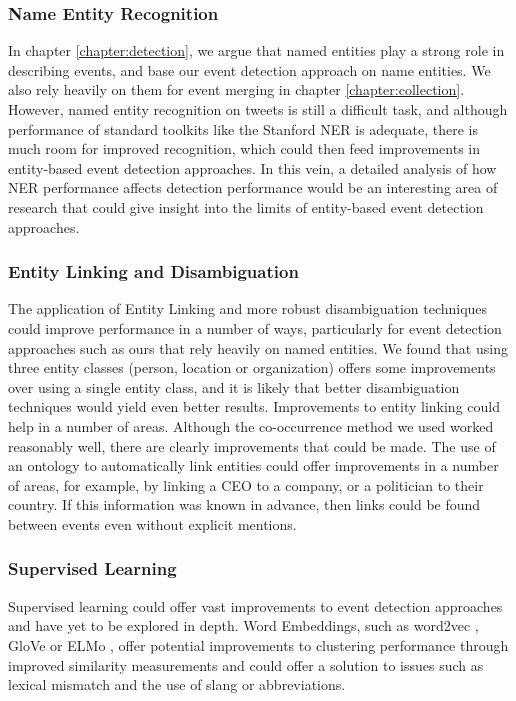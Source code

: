 \subsubsection{Name Entity Recognition}
In chapter \ref{chapter:detection}, we argue that named entities play a strong role in describing events, and base our event detection approach on name entities.
We also rely heavily on them for event merging in chapter \ref{chapter:collection}.
However, named entity recognition on tweets is still a difficult task, and although performance of standard toolkits like the Stanford NER is adequate, there is much room for improved recognition, which could then feed improvements
in entity-based event detection approaches.
In this vein, a detailed analysis of how NER performance affects detection performance would be an interesting area of research that could give insight into the limits of entity-based event detection approaches.

\subsubsection{Entity Linking and Disambiguation}
The application of Entity Linking and more robust disambiguation techniques could improve performance in a number of ways, particularly for event detection approaches such as ours that rely heavily on named entities.
We found that using three entity classes (person, location or organization) offers some improvements over using a single entity class, and it is likely that better disambiguation techniques would yield even better results.
Improvements to entity linking could help in a number of areas.
Although the co-occurrence method we used worked reasonably well, there are clearly improvements that could be made.
The use of an ontology to automatically link entities could offer improvements in a number of areas, for example, by linking a CEO to a company, or a politician to their country.
If this information was known in advance, then links could be found between events even without explicit mentions.

\subsubsection{Supervised Learning}
Supervised learning could offer vast improvements to event detection approaches and have yet to be explored in depth.
Word Embeddings, such as word2vec \citep{mikolov2013distributed}, GloVe \citep{pennington2014glove} or ELMo \citep{DBLP:journals/corr/abs-1802-05365}, offer potential improvements  to clustering performance through improved similarity measurements and could offer a solution to issues such as lexical mismatch and the use of slang or abbreviations.


